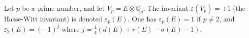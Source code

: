 Let $p$ be a prime number, and let $V_p = E \otimes \mathbb{Q}_p$. The invariant $\varepsilon(V_p) = \pm 1$ (the Hasse-Witt invariant) is denoted $\varepsilon_p(E)$. One has $\varepsilon_p(E) = 1$ if $p \neq 2$, and $\varepsilon_2(E) = (-1)^j$ where $j = \frac{1}{4}(d(E) + r(E) - \sigma(E) - 1)$.
